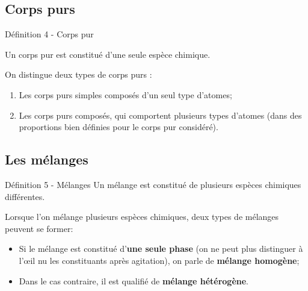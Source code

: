 \documentclass[french, a4paper, 12pt, twocolumn, landscape]{article}
\begin{document}
\subsection{Corps purs}

\begin{definition}{Définition 4 - Corps pur}
	
Un corps pur est constitué d'une seule espèce chimique.
\end{definition}

On distingue deux types de corps purs : 
\begin{enumerate}
	\item Les corps purs simples composés d'un seul type d'atomes;
	\item Les corps purs composés, qui comportent plusieurs types d'atomes (dans des proportions bien définies pour le corps pur considéré).
\end{enumerate}

\subsection{Les mélanges}

\begin{definition}{Définition 5 - Mélanges}
	Un mélange est constitué de plusieurs espèces chimiques différentes.
\end{definition}

Lorsque l'on mélange plusieurs espèces chimiques, deux types de mélanges peuvent se former:\bigskip

\begin{itemize}
	\item Si le mélange est constitué d'\textbf{une seule phase} (on ne peut plus distinguer à l'\oe il nu les constituants après agitation), on parle de \textbf{mélange homogène};\medskip
	
	\item Dans le cas contraire, il est qualifié de \textbf{mélange hétérogène}.
\end{itemize}
\end{document}

